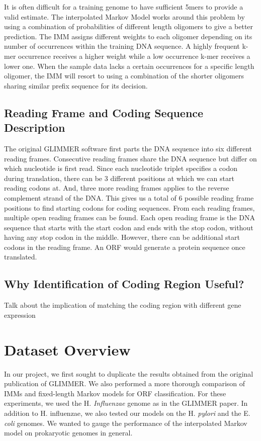 \documentclass[11pt,letterpaper]{article}
\begin{document}
It is often difficult for a training genome to have sufficient 5mers to provide a valid estimate. The interpolated Markov Model works around this problem by using a combination of probabilities of different length oligomers to give a better prediction. The IMM assigns different weights to each oligomer depending on its number of occurrences within the training DNA sequence. A highly frequent k-mer occurrence receives a higher weight while a low occurrence k-mer receives a lower one. When the sample data lacks a certain occurrences for a specific length oligomer, the IMM will resort to using a combination of the shorter oligomers sharing similar prefix sequence for its decision. 


\subsection{Reading Frame and Coding Sequence Description}

The original GLIMMER software first parts the DNA sequence into six different reading frames. Consecutive reading frames share the DNA sequence but differ on which nucleotide is first read. Since each nucleotide triplet specifies a codon during translation, there can be 3 different positions at which we can start reading codons at. And, three more reading frames applies to the reverse complement strand of the DNA. This gives us a total of 6 possible reading frame positions to find starting codons for coding sequences. 
From each reading frames, multiple open reading frames can be found. Each open reading frame is the DNA sequence that starts with the start codon and ends with the stop codon, without having any stop codon in the middle. However, there can be additional start codons in the reading frame. An ORF would generate a protein sequence once translated. 

\subsection{Why Identification of Coding Region Useful?}

Talk about the implication of matching the coding region with different gene expression

\section{Dataset Overview}

In our project, we first sought to duplicate the results obtained from the original publication of GLIMMER. We also performed a more thorough comparison of IMMs and fixed-length Markov models for ORF classification. For these experiments, we used the H. \emph{Influenzae} genome as in the GLIMMER paper. In addition to H. influenzae, we also tested our models on the H. \emph{pylori} and the E. \emph{coli} genomes. We wanted to gauge  the performance of the interpolated Markov model on prokaryotic genomes in general.
\end{document}
